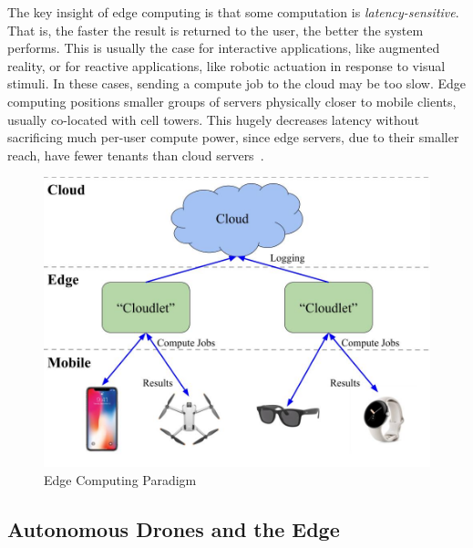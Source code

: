 The key insight of edge computing is that some computation is \textit{latency-sensitive}. That is, the faster the result is returned to the user, the better the system performs. This is usually the case for interactive applications, like augmented reality, or for reactive applications, like robotic actuation in response to visual stimuli. In these cases, sending a compute job to the cloud may be too slow. Edge computing positions smaller groups of servers physically closer to mobile clients, usually co-located with cell towers. This hugely decreases latency without sacrificing much per-user compute power, since edge servers, due to their smaller reach, have fewer tenants than cloud servers~\cite{Charyyev2020,Dolui2017}.

\begin{figure}
    \centering
    \includegraphics[width=0.9\linewidth]{chapter2/FIGS/edge-computing.jpg}
    \caption{Edge Computing Paradigm}
    \label{fig:edge-computing}
\end{figure}

\subsection{Autonomous Drones and the Edge}





